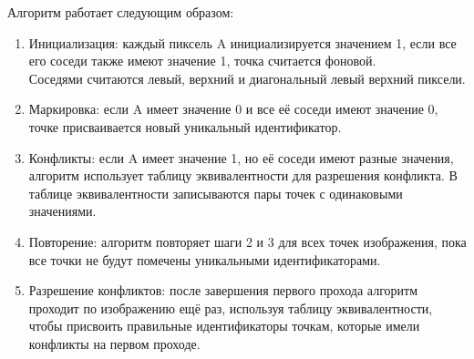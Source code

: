 \documentclass[a4paper,12pt]{article}
\begin{document}
Алгоритм работает следующим образом:
\begin{enumerate}
    

    \item Инициализация: каждый пиксель A инициализируется значением 1, если все его соседи также имеют значение 1, точка считается фоновой. \\
    Соседями считаются левый, верхний и диагональный левый верхний пиксели. 

    \item Маркировка: если A имеет значение 0 и все её соседи имеют значение 0, точке присваивается новый уникальный идентификатор.

    \item Конфликты: если A имеет значение 1, но её соседи имеют разные значения, алгоритм использует таблицу эквивалентности для разрешения конфликта. В таблице эквивалентности записываются пары точек с одинаковыми значениями.

    \item Повторение: алгоритм повторяет шаги 2 и 3 для всех точек изображения, пока все точки не будут помечены уникальными идентификаторами.

    \item Разрешение конфликтов: после завершения первого прохода алгоритм проходит по изображению ещё раз, используя таблицу эквивалентности, чтобы присвоить правильные идентификаторы точкам, которые имели конфликты на первом проходе.
\end{enumerate}
\end{document}
